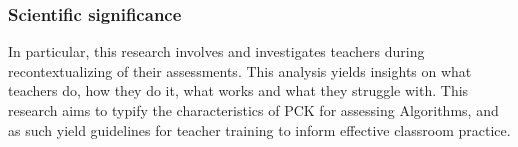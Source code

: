 %

\subsubsection*{Scientific significance}
In particular, this research involves and investigates teachers during recontextualizing of their assessments. This analysis yields insights on what teachers do, how they do it, what works and what they struggle with. This research aims to typify the characteristics of PCK for assessing Algorithms, and as such yield guidelines for teacher training to inform effective classroom practice.

%
%
%
%
%


